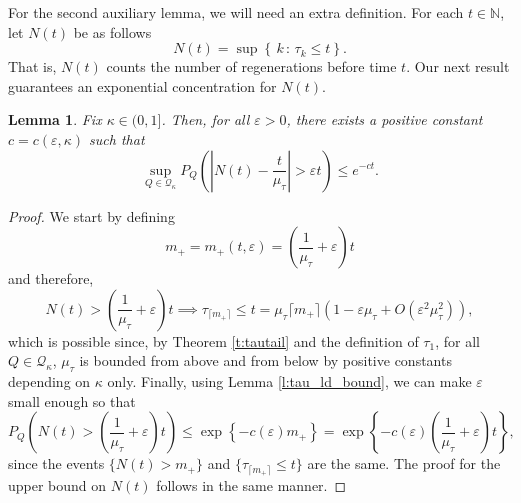 \documentclass[a4paper]{amsart}
\newtheorem{lemma}{Lemma}
\newcommand{\mutau}{\mu_{\tau}}
\begin{document}
For the second auxiliary lemma, we will need an extra definition. For each $t \in \mathbb{N}$, let $N(t)$ be as follows
\begin{equation}
    \label{eq:Ndef}
    N(t) = \sup\left\{\, k \, : \, \tau_k \leq t \right\}.
\end{equation}
That is, $N(t)$ counts the number of regenerations before time $t$. Our next result guarantees an exponential concentration for $N(t)$.
\begin{lemma}
    \label{l:N_ld_bound} Fix $\kappa \in (0,1]$. Then, for all $\varepsilon >0$, there exists a positive constant $c = c(\varepsilon,\kappa)$ such that
    \begin{equation}
       \sup_{Q\in \mathcal{Q}_\kappa} P_Q \left(
                \left|
                    N(t) - \frac{t}{\mutau}
                \right|
                    >
                \varepsilon t
            \right)
            \leq
        e^{- c t}.
    \end{equation}  
\end{lemma}
\begin{proof}
    We start by defining
    \begin{equation}
        \label{eq:mplusdef}
        m_+ = m_+(t, \varepsilon)
            = 
            \left(
                \frac{1}{\mutau} + 
                \varepsilon
            \right)
            t
    \end{equation}
    and therefore,
    \begin{equation}
        \label{eq:Ntldimplication}
        N(t) 
            >
        \left(
            \frac{1}{\mutau} + 
            \varepsilon
        \right)
        t
            \implies
                \tau_{\lceil m_+ \rceil} \leq t 
               = \mutau \lceil m_+ \rceil\left(1-\varepsilon\mutau + O(\varepsilon^2\mutau^2) \right),
    \end{equation}
    which is possible since, by Theorem \ref{t:tautail} and the definition of $\tau_1$, for all $Q \in \mathcal{Q}_\kappa$, $\mutau$ is bounded from above and from below by positive constants depending on $\kappa$ only. Finally, using Lemma \ref{l:tau_ld_bound}, we can make $\varepsilon$ small enough so that
    \begin{equation}
        \label{eq:Ntldbound2}
        P_Q \left(
            N(t) 
                >
            \left(
                \frac{1}{\mutau} + 
                \varepsilon
            \right)
            t
        \right)
        \leq
            \exp
            \left\{
                -c(\varepsilon) m_+
            \right\}
        =
            \exp
            \left\{
                -c(\varepsilon)  
                \left(
                    \frac{1}{\mutau} + 
                    \varepsilon
                \right)
                t
            \right\},
    \end{equation}
    since the events $\{N(t) > m_+\}$ and $\{\tau_{\lceil m_+ \rceil} \leq t\}$ are the same. The proof for the upper bound on $N(t)$ follows in the same manner.
\end{proof}
\end{document}
